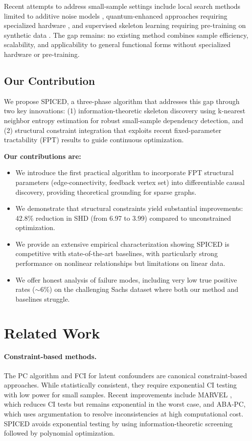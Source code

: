 \documentclass{article}
\begin{document}
Recent attempts to address small-sample settings include local search methods limited to additive noise models \citep{maasch2024local}, quantum-enhanced approaches requiring specialized hardware \citep{arai2025quantum}, and supervised skeleton learning requiring pre-training on synthetic data \citep{ma2024scalable}. The gap remains: no existing method combines sample efficiency, scalability, and applicability to general functional forms without specialized hardware or pre-training.

\subsection{Our Contribution}

We propose SPICED, a three-phase algorithm that addresses this gap through two key innovations: (1) information-theoretic skeleton discovery using k-nearest neighbor entropy estimation for robust small-sample dependency detection, and (2) structural constraint integration that exploits recent fixed-parameter tractability (FPT) results \citep{ganian2024revisiting} to guide continuous optimization.

\textbf{Our contributions are:}
\begin{itemize}
    \item We introduce the first practical algorithm to incorporate FPT structural parameters (edge-connectivity, feedback vertex set) into differentiable causal discovery, providing theoretical grounding for sparse graphs.
    \item We demonstrate that structural constraints yield substantial improvements: 42.8\% reduction in SHD (from 6.97 to 3.99) compared to unconstrained optimization.
    \item We provide an extensive empirical characterization showing SPICED is competitive with state-of-the-art baselines, with particularly strong performance on nonlinear relationships but limitations on linear data.
    \item We offer honest analysis of failure modes, including very low true positive rates ($\sim$6\%) on the challenging Sachs dataset where both our method and baselines struggle.
\end{itemize}

\section{Related Work}

\paragraph{Constraint-based methods.} The PC algorithm \citep{spirtes2000causation} and FCI for latent confounders are canonical constraint-based approaches. While statistically consistent, they require exponential CI testing with low power for small samples. Recent improvements include MARVEL \citep{mokhtarian2021marvel}, which reduces CI tests but remains exponential in the worst case, and ABA-PC, which uses argumentation to resolve inconsistencies at high computational cost. SPICED avoids exponential testing by using information-theoretic screening followed by polynomial optimization.
\end{document}
